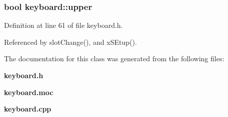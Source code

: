 \subsubsection{\setlength{\rightskip}{0pt plus 5cm}bool {\bf keyboard::upper}\hspace{0.3cm}{\tt  [private]}}\label{classkeyboard_keyboardr44}




Definition at line 61 of file keyboard.h.

Referenced by slot\-Change(), and x\-SEtup().

The documentation for this class was generated from the following files:\begin{CompactItemize}
\item 
{\bf keyboard.h}\item 
{\bf keyboard.moc}\item 
{\bf keyboard.cpp}\end{CompactItemize}
